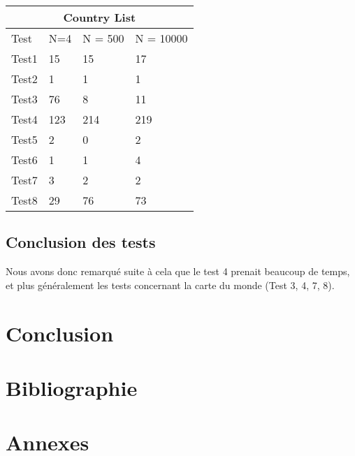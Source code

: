 \documentclass[utf8]{article}
\begin{document}
\begin{large}
\begin{tabular}{ |p{3cm}||p{3cm}|p{3cm}|p{3cm}|  }
 \hline
 \multicolumn{4}{|c|}{Country List} \\
 \hline
 Test & N=4 & N = 500 & N = 10000\\
 \hline
 Test1   & 15    & 15&   17\\
 Test2 &   1  & 1   & 1\\
 Test3 & 76 & 8&  11\\
 Test4    & 123 & 214&  219\\
 Test5 &   2  & 0& 2\\
 Test6 & 1  & 1   & 4\\
 Test7& 3  & 2& 2\\
 Test8& 29 & 76 & 73\\
 \hline
\end{tabular}

\subsection{Conclusion des tests}
Nous avons donc remarqué suite à cela que le test 4 prenait beaucoup de temps,
et plus généralement les tests concernant la carte du monde (Test 3, 4, 7, 8).

\section{Conclusion}
\indent
\par
\par

\section{Bibliographie}

\section{Annexes}

\end{large}
\end{document}
